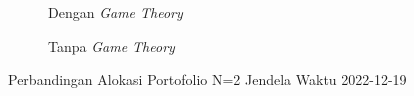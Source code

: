 % 
% 
% 
% 

% 
% 
% 
% 

\begin{figure}[!htbp]\centering\begin{subfigure}[b]{0.48\textwidth}\centering


\caption{Dengan \textit{Game Theory}}\end{subfigure}\hfill\begin{subfigure}[b]{0.48\textwidth}\centering


\caption{Tanpa \textit{Game Theory}}\end{subfigure}\caption{Perbandingan Alokasi Portofolio N=2 Jendela Waktu 2022-12-19}\label{fig:window_2022_12_19}\end{figure}

